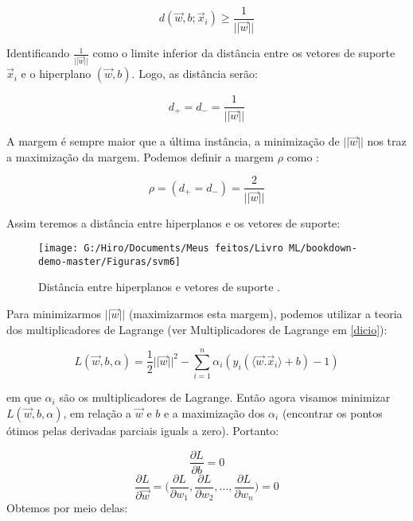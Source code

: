 \documentclass[
]{book}
\begin{document}
\begin{equation}
d(\vec{w},b;\vec{x}_i)\geq \frac{1}{||\vec{w}||}
\label{eq:distcrestri}
\end{equation}

Identificando \(\frac{1}{||\vec{w}||}\) como o limite inferior da distância entre os vetores de suporte \(\vec{x}_i\) e o hiperplano \((\vec{w},b)\). Logo, as distância serão:

\begin{equation}
d_+=d_-=\frac{1}{||\vec{w}||}
\label{eq:distanciamarg}
\end{equation}

A margem é sempre maior que a última instância, a minimização de \(||\vec{w}||\) nos traz a maximização da margem. Podemos definir a margem \(\rho\) como \citep{gonccalves2015maquina}:

\begin{equation}
\rho=(d_+=d_-)=\frac{2}{||\vec{w}||}
\label{eq:margemsvm}
\end{equation}

Assim teremos a distância entre hiperplanos e os vetores de suporte:

\begin{figure}

{\centering \texttt{[image: G:/Hiro/Documents/Meus feitos/Livro ML/bookdown-demo-master/Figuras/svm6]} 

}

\caption{Distância entre hiperplanos e vetores de suporte \citep{gonccalves2015maquina}.}\label{fig:svm6}
\end{figure}



Para minimizarmos \(||\vec{w}||\) (maximizarmos esta margem), podemos utilizar a teoria dos multiplicadores de Lagrange (ver Multiplicadores de Lagrange em \ref{dicio}):

\begin{equation}
L(\vec{w},b,\alpha)=\frac{1}{2}||\vec{w}||^2-\displaystyle \sum^n_{i=1}\alpha_i(y_i(\langle\vec{w}.\vec{x}_i\rangle+b)-1)
\label{eq:lagrangemargem}
\end{equation}

em que \(\alpha_i\) são os multiplicadores de Lagrange. Então agora visamos minimizar \(L(\vec{w},b,\alpha)\), em relação a \(\vec{w}\) e \(b\) e a maximização dos \(\alpha_i\) (encontrar os pontos ótimos pelas derivadas parciais iguals a zero). Portanto:

\[\frac{\partial L}{\partial b}=0\]
\[\frac{\partial L}{\partial \vec{w}}=\bigg(\frac{\partial L}{\partial w_1},\frac{\partial L}{\partial w_2},...,\frac{\partial L}{\partial w_n}\bigg)=0\]
Obtemos por meio delas:
\end{document}
